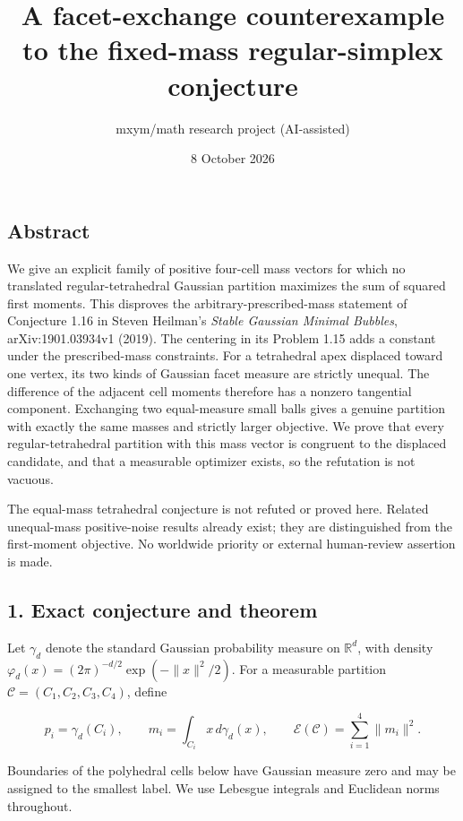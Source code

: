 \documentclass[
  11pt,
]{article}
\title{A facet-exchange counterexample to the fixed-mass regular-simplex
conjecture}
\author{mxym/math research project (AI-assisted)}
\date{8 October 2026}
\begin{document}
\maketitle

\subsection{Abstract}\label{abstract}

We give an explicit family of positive four-cell mass vectors for which
no translated regular-tetrahedral Gaussian partition maximizes the sum
of squared first moments. This disproves the arbitrary-prescribed-mass
statement of Conjecture 1.16 in Steven Heilman's \emph{Stable Gaussian
Minimal Bubbles}, arXiv:1901.03934v1 (2019). The centering in its
Problem 1.15 adds a constant under the prescribed-mass constraints. For
a tetrahedral apex displaced toward one vertex, its two kinds of
Gaussian facet measure are strictly unequal. The difference of the
adjacent cell moments therefore has a nonzero tangential component.
Exchanging two equal-measure small balls gives a genuine partition with
exactly the same masses and strictly larger objective. We prove that
every regular-tetrahedral partition with this mass vector is congruent
to the displaced candidate, and that a measurable optimizer exists, so
the refutation is not vacuous.

The equal-mass tetrahedral conjecture is not refuted or proved here.
Related unequal-mass positive-noise results already exist; they are
distinguished from the first-moment objective. No worldwide priority or
external human-review assertion is made.

\subsection{1. Exact conjecture and
theorem}\label{exact-conjecture-and-theorem}

Let \(\gamma_d\) denote the standard Gaussian probability measure on
\(\mathbb R^d\), with density
\(\varphi_d(x)=(2\pi)^{-d/2}\exp(-\|x\|^2/2)\). For a measurable
partition \(\mathcal C=(C_1,C_2,C_3,C_4)\), define

\[
 p_i=\gamma_d(C_i),\qquad m_i=\int_{C_i}x\,d\gamma_d(x),
 \qquad \mathcal E(\mathcal C)=\sum_{i=1}^4\|m_i\|^2.       \tag{1}
\]

Boundaries of the polyhedral cells below have Gaussian measure zero and
may be assigned to the smallest label. We use Lebesgue integrals and
Euclidean norms throughout.
\end{document}
